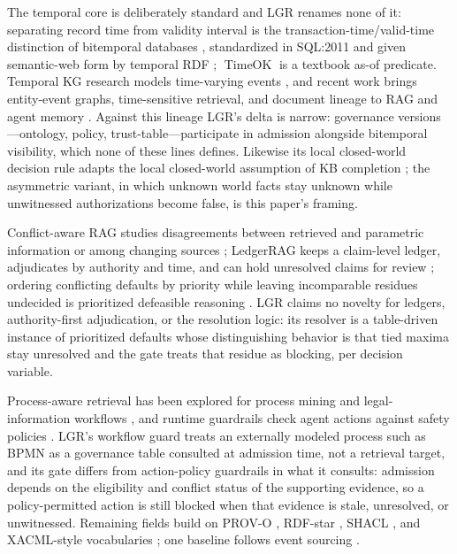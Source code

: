 \documentclass[conference]{IEEEtran}
\newcommand{\lgr}{\textsc{LGR}\xspace}
\begin{document}
The temporal core is deliberately standard and \lgr renames none of it: separating record time from validity interval is the transaction-time/valid-time distinction of bitemporal databases \cite{bitemporal}, standardized in SQL:2011 \cite{sql2011} and given semantic-web form by temporal RDF \cite{temporalrdf}; $\operatorname{TimeOK}$ is a textbook as-of predicate. Temporal KG research models time-varying events \cite{knowevolve}, and recent work brings entity-event graphs, time-sensitive retrieval, and document lineage to RAG and agent memory \cite{e2rag,tgrag,kgirag,graphiti,versionrag}. Against this lineage \lgr's delta is narrow: governance versions---ontology, policy, trust-table---participate in admission alongside bitemporal visibility, which none of these lines defines. Likewise its local closed-world decision rule adapts the local closed-world assumption of KB completion \cite{knowledgevault}; the asymmetric variant, in which unknown world facts stay unknown while unwitnessed authorizations become false, is this paper's framing.

Conflict-aware RAG studies disagreements between retrieved and parametric information or among changing sources \cite{tgragconflict,truthfulrag}; LedgerRAG keeps a claim-level ledger, adjudicates by authority and time, and can hold unresolved claims for review \cite{ledgerrag}; ordering conflicting defaults by priority while leaving incomparable residues undecided is prioritized defeasible reasoning \cite{defeasible}. \lgr claims no novelty for ledgers, authority-first adjudication, or the resolution logic: its resolver is a table-driven instance of prioritized defaults whose distinguishing behavior is that tied maxima stay unresolved and the gate treats that residue as blocking, per decision variable.

Process-aware retrieval has been explored for process mining and legal-information workflows \cite{grag4pm,a2jrag}, and runtime guardrails check agent actions against safety policies \cite{guardagent}. \lgr's workflow guard treats an externally modeled process such as BPMN \cite{bpmn} as a governance table consulted at admission time, not a retrieval target, and its gate differs from action-policy guardrails in what it consults: admission depends on the eligibility and conflict status of the supporting evidence, so a policy-permitted action is still blocked when that evidence is stale, unresolved, or unwitnessed. Remaining fields build on PROV-O \cite{prov}, RDF-star \cite{rdfstar}, SHACL \cite{shacl}, and XACML-style vocabularies \cite{xacml}; one baseline follows event sourcing \cite{eventsourcing}.
\end{document}
